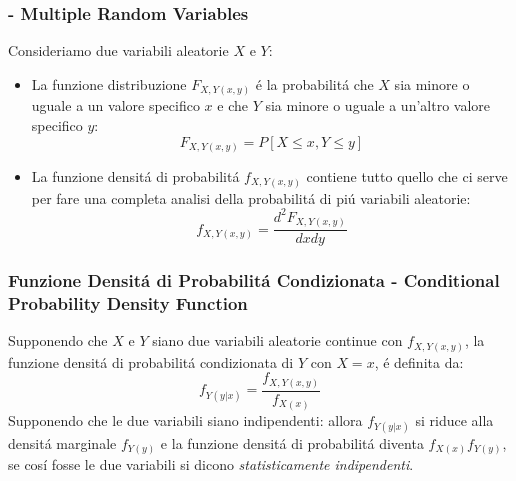         \subsubsection{ - Multiple Random Variables}
            Consideriamo due variabili aleatorie $X$ e $Y$:
            \begin{itemize}
                \item {
                    La funzione distribuzione $F_{X,Y (x,y)}$ é la probabilitá che $X$ sia minore o uguale a un valore specifico $x$ e che $Y$
                    sia minore o uguale a un'altro valore specifico $y$:
                    \[
                        F_{X,Y (x,y)} = P[X\leq x,Y\leq y]    
                    \]
                }
                \item {
                    La funzione densitá di probabilitá $f_{X,Y (x,y)}$ contiene tutto quello che ci serve per fare una completa analisi della probabilitá
                    di piú variabili aleatorie:
                    \[
                        f_{X,Y (x,y)} = \frac{d^2 F_{X,Y (x,y)}}{dxdy}     
                    \]

                }
            \end{itemize}
        \subsubsection{Funzione Densitá di Probabilitá Condizionata - Conditional Probability Density Function}
            Supponendo che $X$ e $Y$ siano due variabili aleatorie continue con $f_{X,Y (x,y)}$, la funzione densitá di probabilitá condizionata di $Y$ con $X=x$,
            é definita da:
            \[
                f_{Y (y|x)} = \frac{f_{X,Y (x,y)}}{f_{X(x)}}     
            \]
            Supponendo che le due variabili siano indipendenti: allora $f_{Y (y|x)}$ si riduce alla densitá marginale $f_{Y (y)}$ e la funzione densitá di
            probabilitá diventa $f_{X (x)}f_{Y (y)}$, se cosí fosse le due variabili si dicono \emph{statisticamente indipendenti}.
